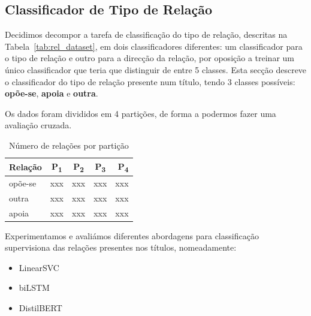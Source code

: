 \documentclass[a4paper, twocolumn, 11pt, twoside]{article}
\begin{document}
\subsection{Classificador de Tipo de Relação}
\label{subsec:rel_classifier}

Decidimos decompor a tarefa de classificação do tipo de relação, descritas na Tabela~\ref{tab:rel_dataset}, em dois classificadores diferentes: um classificador para o tipo de relação e outro para a direcção da relação, por oposição a treinar um único classificador que teria que distinguir de entre 5 classes. Esta secção descreve o classificador do tipo de relação presente num título, tendo 3 classes possíveis: \textbf{opõe-se}, \textbf{apoia} e \textbf{outra}.

Os dados foram divididos em 4 partições, de forma a podermos fazer uma avaliação cruzada. 

\begin{table}[!h]
    \begin{center}
    \begin{tabular}{l cccr}
        {\bf Relação} & {\bf P\textsubscript{1}}&  {\bf P\textsubscript{2}}  & {\bf P\textsubscript{3}} & {\bf P\textsubscript{4}} \\
        \hline
        opõe-se          &  xxx  &  xxx  &  xxx  & xxx \\
        outra            &  xxx  &  xxx  &  xxx  & xxx \\
        apoia            &  xxx  &  xxx  &  xxx  & xxx \\
		\hline
    \end{tabular}
	\caption{Número de relações por partição}
	\end{center}
\end{table}



Experimentamos e avaliámos diferentes abordagens para classificação supervisiona das relações presentes nos títulos, nomeadamente:

\begin{itemize}
\item LinearSVC
\item biLSTM
\item DistilBERT
\end{itemize}
\end{document}
